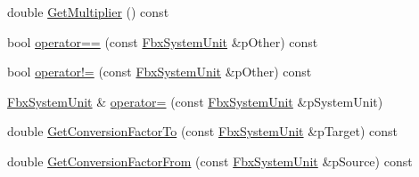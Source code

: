 \begin{DoxyCompactItemize}
\item 
double \hyperlink{class_fbx_system_unit_ab9b59b5de500d63e0ef832818948a024}{Get\+Multiplier} () const
\item 
bool \hyperlink{class_fbx_system_unit_a28f701aa2d2df44e7b89d10e66a1d892}{operator==} (const \hyperlink{class_fbx_system_unit}{Fbx\+System\+Unit} \&p\+Other) const
\item 
bool \hyperlink{class_fbx_system_unit_a4a338e68ec0e74358850cca54ea5a5f6}{operator!=} (const \hyperlink{class_fbx_system_unit}{Fbx\+System\+Unit} \&p\+Other) const
\item 
\hyperlink{class_fbx_system_unit}{Fbx\+System\+Unit} \& \hyperlink{class_fbx_system_unit_a91610b2403fd3fdbd0988123cd21eb50}{operator=} (const \hyperlink{class_fbx_system_unit}{Fbx\+System\+Unit} \&p\+System\+Unit)
\item 
double \hyperlink{class_fbx_system_unit_a40c999b638d3cb538da24d76ccd70abd}{Get\+Conversion\+Factor\+To} (const \hyperlink{class_fbx_system_unit}{Fbx\+System\+Unit} \&p\+Target) const
\item 
double \hyperlink{class_fbx_system_unit_a7fa4b5f722c1c4c3b3113c4b0a24e4ff}{Get\+Conversion\+Factor\+From} (const \hyperlink{class_fbx_system_unit}{Fbx\+System\+Unit} \&p\+Source) const
\end{DoxyCompactItemize}
